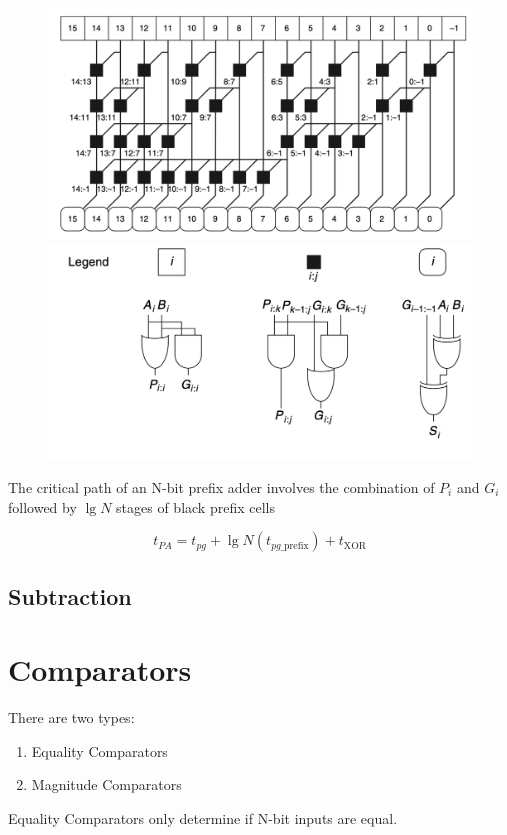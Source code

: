 \documentclass[12pt]{report}
\begin{document}
\begin{figure}[h!]
  \centering
  \includegraphics[width=.7\textwidth]{prefix_adder_schematic.png}
  \includegraphics[width=.7\textwidth]{prefix_schematic_legend.png}
\end{figure}

The critical path of an N-bit prefix adder involves the combination of $P_i$ and $G_i$ followed by $\lg N$ stages of black prefix cells

\[
  t_{PA} = t_{pg} + \lg N \left( t_{pg \_ \mathrm{prefix}} \right) + t_{\mathrm{XOR}}
\]
\pagebreak

\subsection{Subtraction}
\section{Comparators}

There are two types:
\begin{enumerate}
  \item Equality Comparators
  \item Magnitude Comparators
\end{enumerate}

Equality Comparators only determine if N-bit inputs are equal. 
\smallbreak
\end{document}

